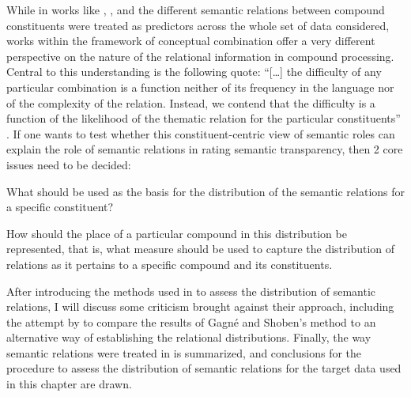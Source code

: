 While in works like \citet{Plagetal:2007}, \citet{Plagetal:2008}, and \citet{BellandSchaefer:2013} the different semantic relations
between compound constituents were treated as predictors across the
whole set of data considered, works within the framework of conceptual
combination
offer a very different perspective on the nature of the
relational information in compound processing. 
Central to this understanding is the following quote: 
% 
``[\dots] the difficulty of any particular
combination is a function neither of its frequency in the language nor
of the complexity of the relation. Instead, we contend that the
difficulty is a function of the likelihood of the thematic relation
for the particular constituents'' \citep[73]{GagneandShoben:1997}. 
If one wants to test whether this constituent-centric view of semantic
roles can explain the role of semantic relations in rating semantic
transparency, then 2 core issues need to be decided:
\begin{inparaenum}[(1)]
\item What should be
used as the basis for the distribution of the semantic relations for a
specific constituent?
\item How should the place of a particular compound in this
distribution be represented, that is, what measure should be used to
capture the distribution of relations as it pertains to a specific
compound and its constituents. 
\end{inparaenum}


After introducing the methods used in \citet{GagneandShoben:1997} to
assess the distribution of semantic relations, I will  discuss some criticism brought
against their approach, including the attempt by
\citet{Maguireetal:2007} to compare the results of Gagné and Shoben's
method to an alternative way of establishing the relational
distributions. Finally, the way semantic relations were
treated in \citet{PhamandBaayen:2013} is summarized, and conclusions
for the procedure to assess the distribution of semantic relations for
the target data used in this chapter are drawn.


